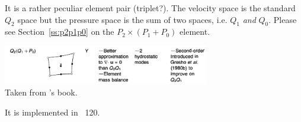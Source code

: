 It is a rather peculiar element pair (triplet?). The velocity space is the standard $Q_2$ space
but the pressure space is the sum of two spaces, i.e. $Q_1$ {\it and} $Q_0$.
Please see Section~\ref{ss:p2p1p0} on the $P_2\times (P_1+P_0)$ element.

\begin{center}
\includegraphics[width=9cm]{images/pair_q2q1q0}\\
{\captionfont Taken from \textcite{grsa}'s book.}
\end{center}

It is implemented in \stone~120.
